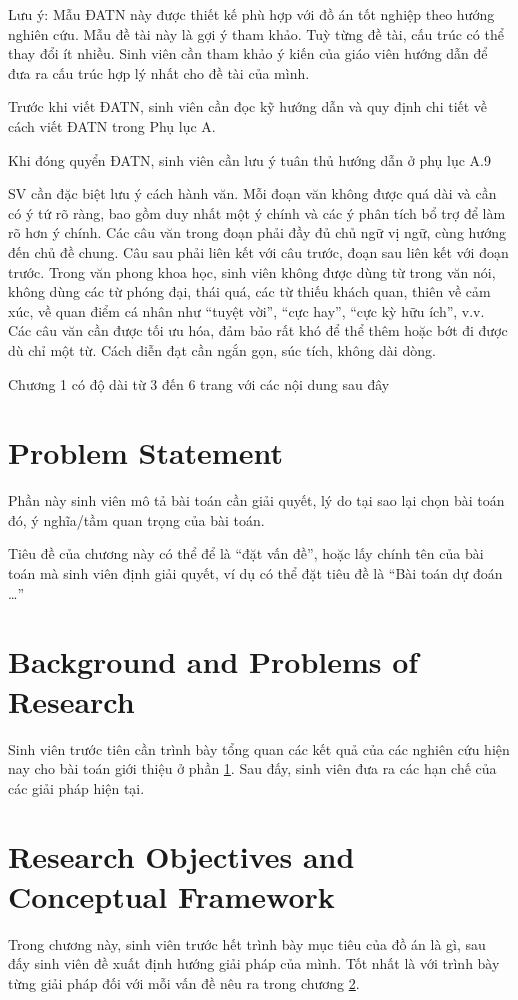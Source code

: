 Lưu ý: Mẫu ĐATN này được thiết kế phù hợp với đồ án tốt nghiệp theo hướng nghiên cứu. Mẫu đề tài này là gợi ý tham khảo. Tuỳ từng đề tài, cấu trúc có thể thay đổi ít nhiều. Sinh viên cần tham khảo ý kiến của giáo viên hướng dẫn để đưa ra cấu trúc hợp lý nhất cho đề tài của mình. 

Trước khi viết ĐATN, sinh viên cần đọc kỹ hướng dẫn và quy định chi tiết về cách viết ĐATN trong Phụ lục A. 

Khi đóng quyển ĐATN, sinh viên cần lưu ý tuân thủ hướng dẫn ở phụ lục A.9

SV cần đặc biệt lưu ý cách hành văn. Mỗi đoạn văn không được quá dài và cần có ý tứ rõ ràng, bao gồm duy nhất một ý chính và các ý phân tích bổ trợ để làm rõ hơn ý chính. Các câu văn trong đoạn phải đầy đủ chủ ngữ vị ngữ, cùng hướng đến chủ đề chung. Câu sau phải liên kết với câu trước, đoạn sau liên kết với đoạn trước. Trong văn phong khoa học, sinh viên không được dùng từ trong văn nói, không dùng các từ phóng đại, thái quá, các từ thiếu khách quan, thiên về cảm xúc, về quan điểm cá nhân như “tuyệt vời”, “cực hay”, “cực kỳ hữu ích”, v.v. Các câu văn cần được tối ưu hóa, đảm bảo rất khó để thể thêm hoặc bớt đi được dù chỉ một từ. Cách diễn đạt cần ngắn gọn, súc tích, không dài dòng.

Chương 1 có độ dài từ 3 đến 6 trang với các nội dung sau đây


\section{Problem Statement}
\label{sec:dvd}
Phần này sinh viên mô tả bài toán cần giải quyết, lý do tại sao lại chọn bài toán đó, ý nghĩa/tầm quan trọng của bài toán.

Tiêu đề của chương này có thể để là ``đặt vấn đề'', hoặc lấy chính tên của bài toán mà sinh viên định giải quyết, ví dụ có thể đặt tiêu đề là ``Bài toán dự đoán …” 


\section{Background and Problems of Research} 
\label{sec:giaiphap}
Sinh viên trước tiên cần trình bày tổng quan các kết quả của các nghiên cứu hiện nay cho bài toán giới thiệu ở phần \ref{sec:dvd}. Sau đấy, sinh viên đưa ra các hạn chế của các giải pháp hiện tại. 

\section{Research Objectives and Conceptual Framework}
Trong chương này, sinh viên trước hết trình bày mục tiêu của đồ án là gì, sau đấy sinh viên đề xuất định hướng giải pháp của mình. Tốt nhất là với trình bày từng giải pháp đối với mỗi vấn đề nêu ra trong chương \ref{sec:giaiphap}. 

